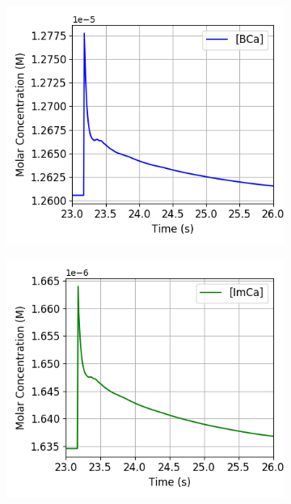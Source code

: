 \documentclass[a4paper,12pt]{article}
\theoremstyle{definition}
\begin{document}
\begin{figure}
  \begin{subfigure}{0.5\textwidth}
    \includegraphics[width=\textwidth]{figures/concentration_dynamics_18_zoomed_BCa.png}
    \caption{}
  \end{subfigure}
  \begin{subfigure}{0.5\textwidth}
    \includegraphics[width=\textwidth]{figures/concentration_dynamics_18_zoomed_ImCa.png}
    \caption{}
  \end{subfigure}
  \begin{subfigure}{0.5\textwidth}

\end{subfigure}
\end{figure}
\end{document}
